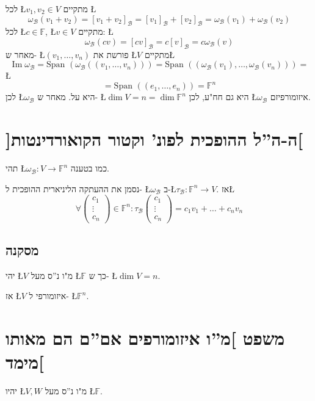 \documentclass[english,hebrew]{article}
\newcommand{\spn}{\text{Span }}
\begin{document}
לכל \L{$v_{1},v_{2}\in V$} מתקיים \L{%
\[
\omega_{\mathcal{B}}(v_{1}+v_{2})=[v_{1}+v_{2}]_{\mathcal{B}}=[v_{1}]_{\mathcal{B}}+[v_{2}]_{\mathcal{B}}=\omega_{\mathcal{B}}(v_{1})+\omega_{\mathcal{B}}(v_{2})
\]
}%
לכל \L{$c\in\mathbb{F}$}, \L{$v\in V$} מתקיים: \L{%
\[
\omega_{\mathcal{B}}(cv)=[cv]_{\mathcal{B}}=c[v]_{\mathcal{B}}=c\omega_{\mathcal{B}}(v)
\]
}%
מאחר ש- \L{$(v_{1},\dots,v_{n})$} פורשת את \L{$V$} מתקיים\L{%
\[
\operatorname{Im}\omega_{\mathcal{B}}=\spn(\omega_{\mathcal{B}}((v_{1},\dots,v_{n})))=\spn((\omega_{\mathcal{B}}(v_{1}),\dots,\omega_{\mathcal{B}}(v_{n})))=
\]
}%
\L{%
\[
=\spn((e_{1},\dots,e_{n}))=\mathbb{F}^{n}
\]
}%
לכן \L{$\omega_{\mathcal{B}}$} היא על. מאחר ש- \L{$\dim V=n=\dim\mathbb{F}^{n}$}
היא גם חח"ע, לכן \L{$\omega_{\mathcal{B}}$} איזומורפיזם.

\section{{]}ה-ה\textquotedblright ל ההופכית לפונ' וקטור הקואורדינטות{[}}

תהי \L{$\omega_{\mathcal{B}}:V\to\mathbb{F}^{n}$} כמו בטענה.

נסמן את ההעתקה הליניארית ההופכית ל- \L{$\omega_{\mathcal{B}}$} ב-\L{$\tau_{\mathcal{B}}:\mathbb{F}^{n}\to V$}.
אז\L{%
\[
\forall\begin{pmatrix}c_{1}\\
\vdots\\
c_{n}
\end{pmatrix}\in\mathbb{F}^{n}:\tau_{\mathcal{B}}\begin{pmatrix}c_{1}\\
\vdots\\
c_{n}
\end{pmatrix}=c_{1}v_{1}+\dots+c_{n}v_{n}
\]
}%

\subsection{מסקנה}

יהי \L{$V$} מ"ו נ\textquotedblright ס מעל \L{$\mathbb{F}$} כך ש-
\L{$\dim V=n$}.

אז \L{$V$} איזומורפי ל- \L{$\mathbb{F}^{n}$}.

\section{משפט {]}מ\textquotedblright ו איזומורפים אם\textquotedblright ם הם
מאותו מימד{[}}

יהיו \L{$V,W$} מ"ו נ\textquotedblright ס מעל \L{$\mathbb{F}$}.
\end{document}
